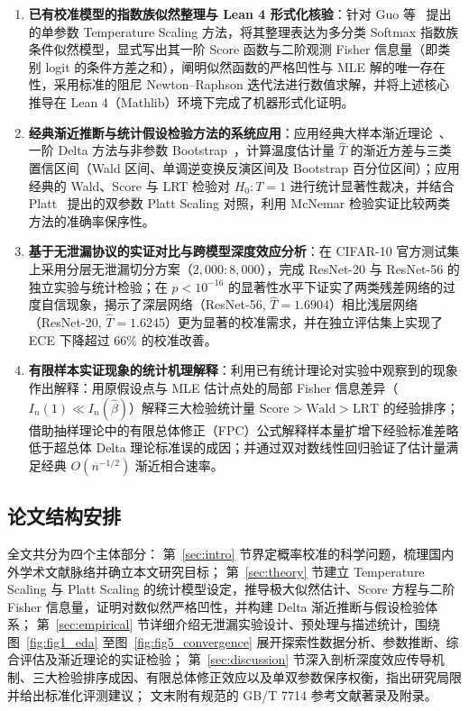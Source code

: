 \begin{enumerate}
\item \textbf{已有校准模型的指数族似然整理与 Lean 4 形式化核验}：针对 Guo 等~\cite{guo2017calibration} 提出的单参数 Temperature Scaling 方法，将其整理表达为多分类 Softmax 指数族条件似然模型，显式写出其一阶 Score 函数与二阶观测 Fisher 信息量（即类别 logit 的条件方差之和），阐明似然函数的严格凹性与 MLE 解的唯一存在性，采用标准的阻尼 Newton--Raphson 迭代法进行数值求解，并将上述核心推导在 Lean 4（Mathlib）环境下完成了机器形式化证明。
\item \textbf{经典渐近推断与统计假设检验方法的系统应用}：应用经典大样本渐近理论~\cite{lehmann1998theory,vandervaart1998asymptotic}、一阶 Delta 方法与非参数 Bootstrap~\cite{efron1994introduction}，计算温度估计量 $\hat T$ 的渐近方差与三类置信区间（Wald 区间、单调逆变换反演区间及 Bootstrap 百分位区间）；应用经典的 Wald、Score 与 LRT 检验对 $H_0: T=1$ 进行统计显著性裁决，并结合 Platt~\cite{platt1999probabilistic} 提出的双参数 Platt Scaling 对照，利用 McNemar 检验实证比较两类方法的准确率保序性。
\item \textbf{基于无泄漏协议的实证对比与跨模型深度效应分析}：在 CIFAR-10 官方测试集上采用分层无泄漏切分方案（$2{,}000:8{,}000$），完成 ResNet-20 与 ResNet-56 的独立实验与统计检验；在 $p < 10^{-16}$ 的显著性水平下证实了两类残差网络的过度自信现象，揭示了深层网络（ResNet-56, $\hat T=1.6904$）相比浅层网络（ResNet-20, $\hat T=1.6245$）更为显著的校准需求，并在独立评估集上实现了 ECE 下降超过 $66\%$ 的校准改善。
\item \textbf{有限样本实证现象的统计机理解释}：利用已有统计理论对实验中观察到的现象作出解释：用原假设点与 MLE 估计点处的局部 Fisher 信息差异（$I_n(1) \ll I_n(\hat\beta)$）解释三大检验统计量 $\text{Score} > \text{Wald} > \text{LRT}$ 的经验排序；借助抽样理论中的有限总体修正（FPC）公式解释样本量扩增下经验标准差略低于超总体 Delta 理论标准误的成因；并通过双对数线性回归验证了估计量满足经典 $O(n^{-1/2})$ 渐近相合速率。
\end{enumerate}

\subsection{论文结构安排}

全文共分为四个主体部分：
第~\ref{sec:intro} 节界定概率校准的科学问题，梳理国内外学术文献脉络并确立本文研究目标；
第~\ref{sec:theory} 节建立 Temperature Scaling 与 Platt Scaling 的统计模型设定，推导极大似然估计、Score 方程与二阶 Fisher 信息量，证明对数似然严格凹性，并构建 Delta 渐近推断与假设检验体系；
第~\ref{sec:empirical} 节详细介绍无泄漏实验设计、预处理与描述统计，围绕图~\ref{fig:fig1_eda} 至图~\ref{fig:fig5_convergence} 展开探索性数据分析、参数推断、综合评估及渐近理论的实证检验；
第~\ref{sec:discussion} 节深入剖析深度效应传导机制、三大检验排序成因、有限总体修正效应以及单双参数保序权衡，指出研究局限并给出标准化评测建议；
文末附有规范的 GB/T 7714 参考文献著录及附录。
